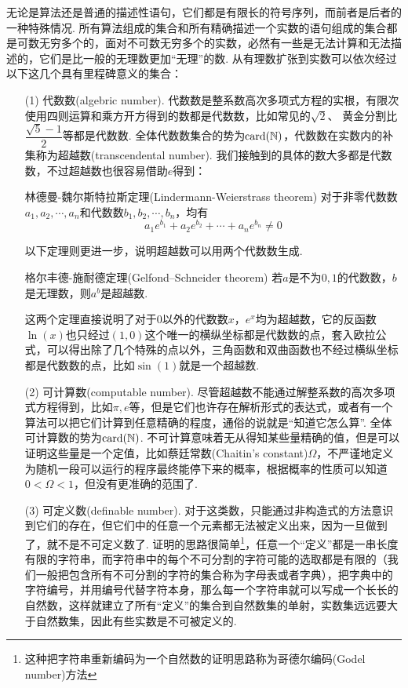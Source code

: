 \documentclass[main.tex]{subfiles}
\begin{document}
无论是算法还是普通的描述性语句，它们都是有限长的符号序列，而前者是后者的一种特殊情况. 所有算法组成的集合和所有精确描述一个实数的语句组成的集合都是可数无穷多个的，面对不可数无穷多个的实数，必然有一些是无法计算和无法描述的，它们是比一般的无理数更加“无理”的数. 从有理数扩张到实数可以依次经过以下这几个具有里程碑意义的集合：
\begin{itemize}
    \item [(1)]
    代数数(algebric number). 代数数是整系数高次多项式方程的实根，有限次使用四则运算和乘方开方得到的数都是代数数，比如常见的\(\sqrt2\)、 黄金分割比\(\dfrac{\sqrt{5}-1}{2}\)等都是代数数. 全体代数数集合的势为\({\rm card}(\mathbb{N})\)，代数数在实数内的补集称为超越数(transcendental number). 我们接触到的具体的数大多都是代数数，不过超越数也很容易借助\(e\)得到：
    \begin{theorem}{林德曼-魏尔斯特拉斯定理(Lindermann-Weierstrass theorem)}
        对于非零代数数\(a_1, a_2, \cdots, a_n\)和代数数\(b_1, b_2, \cdots, b_n\)，均有
        \[a_1e^{b_1}+a_2e^{b_2}+\cdots+a_ne^{b_n} \neq 0\]
    \end{theorem}
    以下定理则更进一步，说明超越数可以用两个代数数生成.
    \begin{theorem}{格尔丰德-施耐德定理(Gelfond–Schneider theorem)}
        若\(a\)是不为\(0,1\)的代数数，\(b\)是无理数，则\(a^b\)是超越数.
    \end{theorem}
    这两个定理直接说明了对于\(0\)以外的代数数\(x\)，\(e^x\)均为超越数，它的反函数\(\ln(x)\)也只经过\((1,0)\)这个唯一的横纵坐标都是代数数的点，套入欧拉公式，可以得出除了几个特殊的点以外，三角函数和双曲函数也不经过横纵坐标都是代数数的点，比如\(\sin(1)\)就是一个超越数.
\end{itemize}
\begin{itemize}
    \item[(2)]
    可计算数(computable number). 尽管超越数不能通过解整系数的高次多项式方程得到，比如\(\pi, e\)等，但是它们也许存在解析形式的表达式，或者有一个算法可以把它们计算到任意精确的程度，通俗的说就是“知道它怎么算”. 全体可计算数的势为\({\rm card}(\mathbb{N})\). 不可计算意味着无从得知某些量精确的值，但是可以证明这些量是一个定值，比如蔡廷常数(Chaitin's constant)\(\Omega\)，不严谨地定义为随机一段可以运行的程序最终能停下来的概率，根据概率的性质可以知道\(0<\Omega<1\)，但没有更准确的范围了.
\end{itemize}
\begin{itemize}
    \item[(3)]
    可定义数(definable number). 对于这类数，只能通过非构造式的方法意识到它们的存在，但它们中的任意一个元素都无法被定义出来，因为一旦做到了，就不是不可定义数了. 证明的思路很简单\footnote{这种把字符串重新编码为一个自然数的证明思路称为哥德尔编码(Godel number)方法}，任意一个“定义”都是一串长度有限的字符串，而字符串中的每个不可分割的字符可能的选取都是有限的（我们一般把包含所有不可分割的字符的集合称为字母表或者字典），把字典中的字符编号，并用编号代替字符本身，那么每一个字符串就可以写成一个长长的自然数，这样就建立了所有“定义”的集合到自然数集的单射，实数集远远要大于自然数集，因此有些实数是不可被定义的.
\end{itemize}
\end{document}
